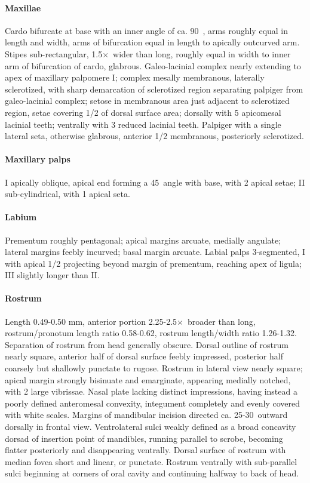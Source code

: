 \documentclass[fleqn,10pt,lineno]{wlpeerj} %
\newcommand{\td}{\textdegree~}
\newcommand{\x}{$\times$~}
\begin{document}
			\paragraph{Maxillae}
				Cardo bifurcate at base with an inner angle of ca. 90\td, arms roughly equal in length and width, arms of bifurcation equal in length to apically outcurved arm. 
				Stipes sub-rectangular, 1.5\x wider than long, roughly equal in width to inner arm of bifurcation of cardo, glabrous. 
				Galeo-lacinial complex nearly extending to apex of maxillary palpomere I; complex mesally membranous, laterally sclerotized, with sharp demarcation of sclerotized region separating palpiger from galeo-lacinial complex; setose in membranous area just adjacent to sclerotized region, setae covering 1/2 of dorsal surface area; dorsally with 5 apicomesal lacinial teeth; ventrally with 3 reduced lacinial teeth. 
				Palpiger with a single lateral seta, otherwise glabrous, anterior 1/2 membranous, posteriorly sclerotized.
			\paragraph{Maxillary palps}
				I apically oblique, apical end forming a 45\td angle with base, with 2 apical setae; II sub-cylindrical, with 1 apical seta.
			\paragraph{Labium}
				Prementum roughly pentagonal; apical margins arcuate, medially angulate; lateral margins feebly incurved; basal margin arcuate. 
				Labial palps 3-segmented, I with apical 1/2 projecting beyond margin of prementum, reaching apex of ligula; III slightly
longer than II.
			\paragraph{Rostrum}
				Length 0.49-0.50 mm, anterior portion 2.25-2.5\x broader than long, rostrum/pronotum length ratio 0.58-0.62, rostrum length/width ratio 1.26-1.32.
				Separation of rostrum from head generally obscure. 
				Dorsal outline of rostrum nearly square, anterior half of dorsal surface feebly impressed, posterior half coarsely but shallowly punctate to rugose. 
				Rostrum in lateral view nearly square; apical margin strongly bisinuate and emarginate, appearing medially notched, with 2 large vibrissae. 
				Nasal plate lacking distinct impressions, having instead a poorly defined anteromesal convexity, integument completely and evenly covered with white scales. 
				Margins of mandibular incision directed ca. 25-30\td outward dorsally in frontal view. 
				Ventrolateral sulci weakly defined as a broad concavity dorsad of insertion point of mandibles, running parallel to scrobe, becoming flatter posteriorly and disappearing ventrally.
				Dorsal surface of rostrum with median fovea short and linear, or punctate.
				Rostrum ventrally with sub-parallel sulci beginning at corners of oral cavity and continuing halfway to back of head.
\end{document}
